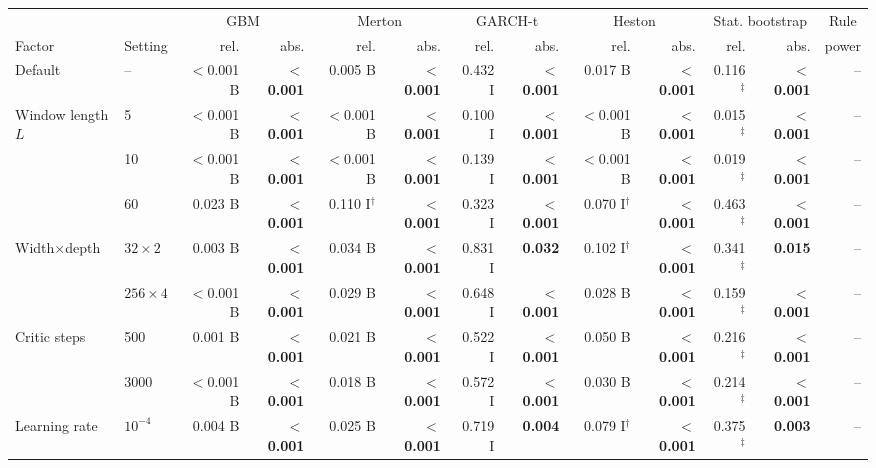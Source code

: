 \begin{tabular}{llrrrrrrrrrrr}
\toprule
 &  & \multicolumn{2}{c}{GBM} & \multicolumn{2}{c}{Merton} & \multicolumn{2}{c}{GARCH-t} & \multicolumn{2}{c}{Heston} & \multicolumn{2}{c}{Stat. bootstrap} & \multicolumn{1}{c}{Rule} \\
\cmidrule(lr){3-4} \cmidrule(lr){5-6} \cmidrule(lr){7-8} \cmidrule(lr){9-10} \cmidrule(lr){11-12} \cmidrule(lr){13-13}
Factor & Setting & rel. & abs. & rel. & abs. & rel. & abs. & rel. & abs. & rel. & abs. & power \\
\midrule
Default & -- & $<$0.001 B & \textbf{$<$0.001} & 0.005 B & \textbf{$<$0.001} & 0.432 I & \textbf{$<$0.001} & 0.017 B & \textbf{$<$0.001} & 0.116$^\ddagger$ & \textbf{$<$0.001} & -- \\
Window length $L$ & 5 & $<$0.001 B & \textbf{$<$0.001} & $<$0.001 B & \textbf{$<$0.001} & 0.100 I & \textbf{$<$0.001} & $<$0.001 B & \textbf{$<$0.001} & 0.015$^\ddagger$ & \textbf{$<$0.001} & -- \\
 & 10 & $<$0.001 B & \textbf{$<$0.001} & $<$0.001 B & \textbf{$<$0.001} & 0.139 I & \textbf{$<$0.001} & $<$0.001 B & \textbf{$<$0.001} & 0.019$^\ddagger$ & \textbf{$<$0.001} & -- \\
 & 60 & 0.023 B & \textbf{$<$0.001} & 0.110 I$^\dagger$ & \textbf{$<$0.001} & 0.323 I & \textbf{$<$0.001} & 0.070 I$^\dagger$ & \textbf{$<$0.001} & 0.463$^\ddagger$ & \textbf{$<$0.001} & -- \\
Width$\times$depth & $32\times2$ & 0.003 B & \textbf{$<$0.001} & 0.034 B & \textbf{$<$0.001} & 0.831 I & \textbf{0.032} & 0.102 I$^\dagger$ & \textbf{$<$0.001} & 0.341$^\ddagger$ & \textbf{0.015} & -- \\
 & $256\times4$ & $<$0.001 B & \textbf{$<$0.001} & 0.029 B & \textbf{$<$0.001} & 0.648 I & \textbf{$<$0.001} & 0.028 B & \textbf{$<$0.001} & 0.159$^\ddagger$ & \textbf{$<$0.001} & -- \\
Critic steps & 500 & 0.001 B & \textbf{$<$0.001} & 0.021 B & \textbf{$<$0.001} & 0.522 I & \textbf{$<$0.001} & 0.050 B & \textbf{$<$0.001} & 0.216$^\ddagger$ & \textbf{$<$0.001} & -- \\
 & 3000 & $<$0.001 B & \textbf{$<$0.001} & 0.018 B & \textbf{$<$0.001} & 0.572 I & \textbf{$<$0.001} & 0.030 B & \textbf{$<$0.001} & 0.214$^\ddagger$ & \textbf{$<$0.001} & -- \\
Learning rate & $10^{-4}$ & 0.004 B & \textbf{$<$0.001} & 0.025 B & \textbf{$<$0.001} & 0.719 I & \textbf{0.004} & 0.079 I$^\dagger$ & \textbf{$<$0.001} & 0.375$^\ddagger$ & \textbf{0.003} & -- \\

\end{tabular}
